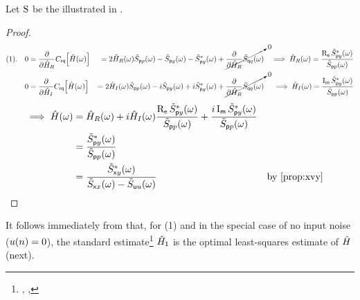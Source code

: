 \begin{proposition}
\label{prop:estHls}
Let $\operatorname{S}$ be the  illustrated in .
\end{proposition}
\begin{proof}
\begin{align*}
  (1).\quad
    0 &= {\frac{{\partial}}{{\partial\hat{H}_R}} }C_{\mathsf{rq}}{\left[\hat{H}(\omega)\right]}
      &= 2\hat{H}_R(\omega)\tilde{S}_{{\mathsf pp}}(\omega) -  \tilde{S}_{{\mathsf py}}(\omega) -  \tilde{S}_{{\mathsf py}}^\ast(\omega) + \cancelto{0}{{\frac{{\partial}}{{\partial\hat{H}_R}} }\tilde{S}_{{\mathsf qq}}(\omega)}
     &&\implies \hat{H}_R(\omega) = \frac{\operatorname{R_{\mathsf{e}}}\tilde{S}_{{\mathsf py}}^\ast(\omega)}{\tilde{S}_{{\mathsf pp}}(\omega)}
     \\
    0 &= {\frac{{\partial}}{{\partial\hat{H}_I}} }C_{\mathsf{rq}}{\left[\hat{H}(\omega)\right]}
      &= 2\hat{H}_I(\omega)\tilde{S}_{{\mathsf pp}}(\omega) -  i\tilde{S}_{{\mathsf py}}(\omega) + i\tilde{S}_{{\mathsf py}}^\ast(\omega) + \cancelto{0}{{\frac{{\partial}}{{\partial\hat{H}_R}} }\tilde{S}_{{\mathsf qq}}(\omega)}
     &&\implies \hat{H}_I(\omega) = \frac{\operatorname{I_{\mathsf{m}}}\tilde{S}_{{\mathsf py}}^\ast(\omega)}{\tilde{S}_{{\mathsf pp}}(\omega)}
\end{align*}
\begin{align*}
    \implies \estH(\omega)
      &\eqd \estH_R(\omega) + i\estH_I(\omega)
        \frac{\Real\Swpy^\ast(\omega)}{\Swpp(\omega)}
        + \frac{i\Imag\Swpy^\ast(\omega)}{\Swpp(\omega)}
    \\&= \frac{\Swpy^\ast(\omega)}{\Swpp(\omega)}
    \\&= \frac{\Swxy^\ast(\omega)}{\Swxx(\omega)-\Swuu(\omega)}
      && \text{by \prefp{prop:xvy}}
\end{align*}
\end{proof}

It follows immediately from  that, for (1) and in the special case
of no input noise ($u(n)=0$), the standard estimate\footnote{
  ,
  ,
  }
$\hat{H}_{\mathsf{1}}$ is the optimal
least-squares estimate of ${{\tilde{{H}}}}$ (next).

